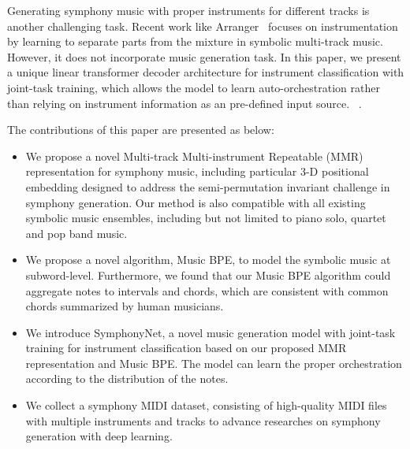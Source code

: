 \documentclass{article}
\begin{document}
Generating symphony music with proper instruments for different tracks is another challenging task.  Recent work like Arranger~\cite{arranger} focuses on instrumentation by learning to separate parts from the mixture in symbolic multi-track music. However, it does not incorporate music generation task. In this paper, we present a unique linear transformer decoder architecture for instrument classification with joint-task training, which allows the model to learn auto-orchestration rather than relying on instrument information as an pre-defined input source. ~\cite{musenet,popmag,lakhnes,mmm}.

The contributions of this paper are presented as below:
\begin{itemize}
    \item We propose a novel Multi-track Multi-instrument Repeatable (MMR) representation for symphony music, including particular 3-D positional embedding designed to address the  semi-permutation invariant challenge in symphony generation. Our method is also compatible with all existing symbolic music ensembles, including but not limited to piano solo, quartet and pop band music.
  
    \item We propose a novel algorithm, Music BPE, to model the symbolic music at subword-level. Furthermore, we found that our Music BPE algorithm could aggregate notes to intervals and chords, which are consistent with common chords summarized by human musicians. 
    \item We introduce SymphonyNet, a novel music generation model with joint-task training for instrument classification based on our proposed MMR representation and Music BPE. The model can learn the proper orchestration according to the distribution of the notes.
    
    \item  We collect a symphony MIDI dataset, consisting of  high-quality MIDI files with multiple instruments and tracks to advance researches on symphony generation with deep learning.
   
\end{itemize}
\end{document}
